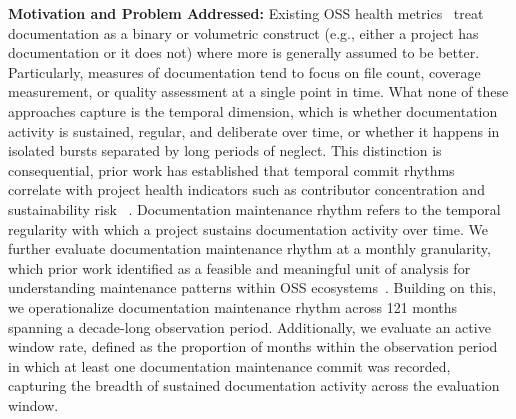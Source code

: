 \documentclass[10pt,conference]{IEEEtran}
\newcommand{\MGuizani}[1]{\textcolor{blue}{{\bfseries [[#1]]}}}
\begin{document}
\textbf{Motivation and Problem Addressed:}
Existing OSS health metrics~\cite{chaoss} treat documentation as a binary or volumetric construct (e.g., either a project has documentation or it does not) where more is generally assumed to be better. 
Particularly, measures of documentation tend to focus on file count, coverage measurement, or quality assessment at a single point in time. 
What none of these approaches capture is the temporal dimension, which is whether documentation activity is sustained, regular, and deliberate over time, or whether it happens in isolated bursts separated by long periods of neglect. This distinction is consequential, prior work has established that temporal commit rhythms  correlate with project health
indicators such as contributor concentration and sustainability
risk ~\cite{destefanis2025introducing, adejumo2026commits}. Documentation maintenance rhythm refers to the temporal regularity with which a project sustains documentation activity over time.
We further evaluate documentation maintenance rhythm at a monthly granularity, which prior work identified as a feasible and meaningful unit of analysis for understanding maintenance patterns within OSS ecosystems~\cite{adejumo2026commits}. 
Building on this, we operationalize documentation maintenance rhythm across 121 months spanning a decade-long observation period.
Additionally, we evaluate an active window rate, defined as the proportion of months within the observation period in which at least one documentation maintenance commit was recorded, capturing the breadth of sustained documentation activity across the evaluation window.


\end{document}
